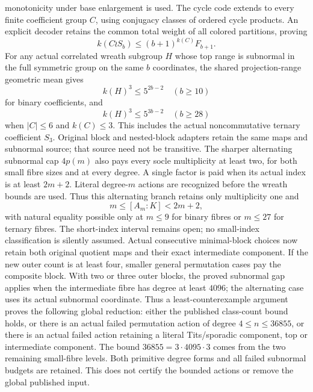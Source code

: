 monotonicity under base enlargement is used.
The cycle code extends to every finite coefficient group $C$, using
conjugacy classes of ordered cycle products. An explicit decoder retains
the common total weight of all colored partitions, proving
\[
 k(C\wr S_b)\leq (b+1)^{k(C)} F_{b+1}.
\]
For any actual correlated wreath subgroup $H$ whose top range is
subnormal in the full symmetric group on the same $b$ coordinates,
the shared projection-range geometric mean gives
\[
 k(H)^3\leq 5^{2b-2}\quad(b\geq10)
\]
for binary coefficients, and
\[
 k(H)^3\leq 5^{3b-2}\quad(b\geq28)
\]
when $|C|\leq6$ and $k(C)\leq3$. This includes the actual noncommutative
ternary coefficient $S_3$. Original block and nested-block adapters retain
the same maps and subnormal source; that source need not be transitive.
The sharper alternating subnormal cap $4p(m)$ also pays every socle
multiplicity at least two, for both small fibre sizes and at every degree.
A single factor is paid when its actual index is at least $2m+2$.
Literal degree-$m$ actions are recognized before the wreath bounds are
used. Thus this alternating branch retains only multiplicity one and
\[
 m\leq[A_m:K]<2m+2,
\]
with natural equality possible only at $m\leq9$ for binary fibres or
$m\leq27$ for ternary fibres. The short-index interval remains open;
no small-index classification is silently assumed.
Actual consecutive minimal-block choices now retain both original
quotient maps and their exact intermediate component. If the new outer
count is at least four, smaller general permutation cases pay the
composite block. With two or three outer blocks, the proved subnormal
gap applies when the intermediate fibre has degree at least $4096$;
the alternating case uses its actual subnormal coordinate.
Thus a least-counterexample argument proves the following global
reduction: either the published class-count bound holds, or there is
an actual failed permutation action of degree $4\leq n\leq36855$, or
there is an actual failed action retaining a literal Tits/sporadic
component, top or intermediate component. The bound $36855=3\cdot4095\cdot3$
comes from the two remaining small-fibre levels. Both primitive degree
forms and all failed subnormal budgets are retained. This does not
certify the bounded actions or remove the global published input.

